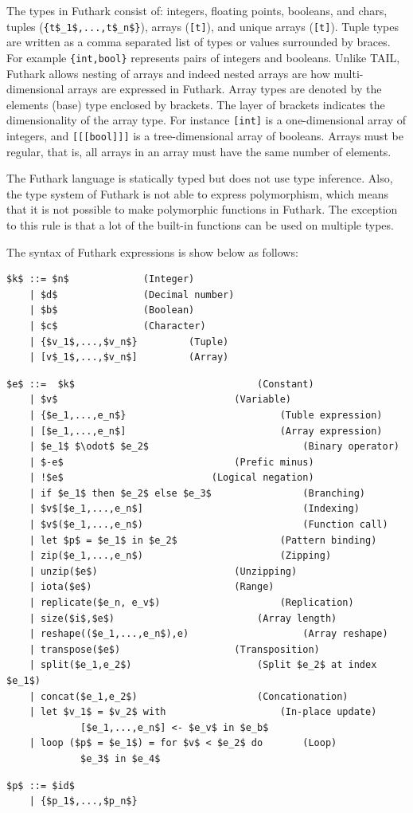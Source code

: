 \documentclass[11pt]{article}
\begin{document}
The types in Futhark consist of: integers, floating points, booleans, and chars, tuples (\lstinline |{t$_1$,...,t$_n$}|), arrays ({\tt [t]}), and unique arrays ({\tt *[t]}).
Tuple types are written as a comma separated list of types or values surrounded by braces.
For example \lstinline|{int,bool}| represents pairs of integers and booleans.
Unlike TAIL, Futhark allows nesting of arrays and indeed nested arrays are how multi-dimensional arrays are expressed in Futhark.
Array types are denoted by the elements (base) type enclosed by brackets.
The layer of brackets indicates the dimensionality of the array type.
For instance {\tt [int]} is a one-dimensional array of integers, and {\tt [[[bool]]]} is a tree-dimensional array of booleans.
Arrays must be regular, that is, all arrays in an array must have the same number of elements.

The Futhark language is statically typed but does not use type inference.
Also, the type system of Futhark is not able to express polymorphism, which means that it is not possible to make polymorphic functions in Futhark.
The exception to this rule is that a lot of the built-in functions can be used on multiple types.

The syntax of Futhark expressions is show below as follows:
\begin{lstlisting}[numbers=none,frame=none]
$k$ ::= $n$				(Integer)
    | $d$				(Decimal number)
    | $b$				(Boolean) 		
    | $c$ 				(Character)
    | {$v_1$,...,$v_n$} 		(Tuple)
    | [v$_1$,...,$v_n$] 		(Array)
\end{lstlisting}

\begin{lstlisting}[numbers=none,frame=none]
$e$ ::=  $k$								(Constant)
    | $v$ 								(Variable)
    | {$e_1,...,e_n$} 							(Tuble expression)
    | [$e_1,...,e_n$] 							(Array expression)
    | $e_1$ $\odot$ $e_2$ 							(Binary operator)
    | $-e$ 								(Prefic minus)
    | !$e$ 							(Logical negation)
    | if $e_1$ then $e_2$ else $e_3$ 				(Branching)
    | $v$[$e_1,...,e_n$] 							(Indexing)
    | $v$($e_1,...,e_n$) 							(Function call)
    | let $p$ = $e_1$ in $e_2$					(Pattern binding)
    | zip($e_1,...,e_n$) 						(Zipping)
    | unzip($e$)						(Unzipping)
    | iota($e$) 						(Range)
    | replicate($e_n, e_v$) 					(Replication)
    | size($i$,$e$) 						(Array length)
    | reshape(($e_1,...,e_n$),e)					(Array reshape)
    | transpose($e$)					(Transposition)
    | split($e_1,e_2$)						(Split $e_2$ at index $e_1$)
    | concat($e_1,e_2$)						(Concationation)
    | let $v_1$ = $v_2$ with					(In-place update)
             [$e_1,...,e_n$] <- $e_v$ in $e_b$
    | loop ($p$ = $e_1$) = for $v$ < $e_2$ do		(Loop)
             $e_3$ in $e_4$
\end{lstlisting}
\begin{lstlisting}[numbers=none,frame=none]
$p$ ::= $id$ 
    | {$p_1$,...,$p_n$}
\end{lstlisting}
\end{document}
